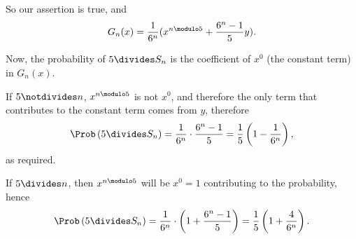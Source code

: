 \begin{enumerate}
          So our assertion is true, and
          \[
              G_n(x) = \frac{1}{6^n} (x^{n \modulo 5} + \frac{6^n - 1}{5}y).
          \]

          Now, the probability of \(5 \divides S_n\) is the coefficient of \(x^0\) (the constant term) in \(G_n(x)\).

          If \(5 \notdivides n\), \(x^{n \modulo 5}\) is not \(x^0\), and therefore the only term that contributes to the constant term comes from \(y\), therefore
          \[
              \Prob\left(5 \divides S_n\right) = \frac{1}{6^n} \cdot \frac{6^n - 1}{5} = \frac{1}{5} \left(1 - \frac{1}{6^n}\right),
          \]
          as required.

          If \(5 \divides n\), then \(x^{n \modulo 5}\) will be \(x^0 = 1\) contributing to the probability, hence
          \[
              \Prob\left(5 \divides S_n\right) = \frac{1}{6^n} \cdot \left(1 + \frac{6^n - 1}{5}\right) = \frac{1}{5} \left(1 + \frac{4}{6^n}\right).
          \]
\end{enumerate}